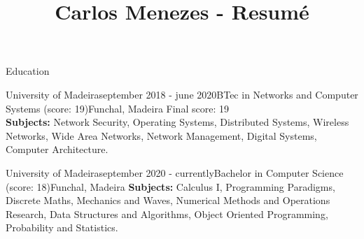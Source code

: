 \documentclass{resume} %
\begin{document}
\title{Carlos Menezes - Resumé}

\begin{rSection}{Education}

\begin{rSubsection}{University of Madeira}{september 2018 - june 2020}{BTec in Networks and Computer Systems (score: 19)}{Funchal, Madeira}
\vspace{-.15cm}
Final score: 19 \\
\textbf{Subjects:} Network Security, Operating Systems, Distributed Systems, Wireless Networks, Wide Area Networks, Network Management, Digital Systems, Computer Architecture.
\item[]
\end{rSubsection}

\vspace{-.2cm}

\begin{rSubsection}{University of Madeira}{september 2020 - currently}{Bachelor in Computer Science (score: 18)}{Funchal, Madeira}
\vspace{-.15cm}
\textbf{Subjects:} Calculus I, Programming Paradigms, Discrete Maths, Mechanics and Waves, Numerical Methods and Operations Research, Data Structures and Algorithms, Object Oriented Programming, Probability and Statistics.
\item[]
\end{rSubsection}

\end{rSection}

\end{document}

